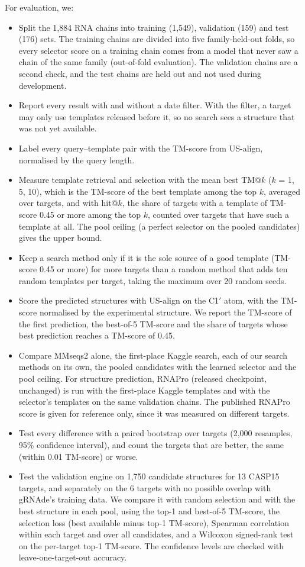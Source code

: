 \documentclass{FastFyp}
\begin{document}
For evaluation, we:
\begin{itemize}
\item Split the 1,884 RNA chains into training (1,549), validation (159) and test (176) sets. The training chains are divided into five family-held-out folds, so every selector score on a training chain comes from a model that never saw a chain of the same family (out-of-fold evaluation). The validation chains are a second check, and the test chains are held out and not used during development.
\item Report every result with and without a date filter. With the filter, a target may only use templates released before it, so no search sees a structure that was not yet available.
\item Label every query--template pair with the TM-score from US-align, normalised by the query length.
\item Measure template retrieval and selection with the mean best TM@$k$ ($k$ = 1, 5, 10), which is the TM-score of the best template among the top $k$, averaged over targets, and with hit@$k$, the share of targets with a template of TM-score 0.45 or more among the top $k$, counted over targets that have such a template at all. The pool ceiling (a perfect selector on the pooled candidates) gives the upper bound.
\item Keep a search method only if it is the sole source of a good template (TM-score 0.45 or more) for more targets than a random method that adds ten random templates per target, taking the maximum over 20 random seeds.
\item Score the predicted structures with US-align on the C1$'$ atom, with the TM-score normalised by the experimental structure. We report the TM-score of the first prediction, the best-of-5 TM-score and the share of targets whose best prediction reaches a TM-score of 0.45.
\item Compare MMseqs2 alone, the first-place Kaggle search, each of our search methods on its own, the pooled candidates with the learned selector and the pool ceiling. For structure prediction, RNAPro (released checkpoint, unchanged) is run with the first-place Kaggle templates and with the selector's templates on the same validation chains. The published RNAPro score is given for reference only, since it was measured on different targets.
\item Test every difference with a paired bootstrap over targets (2,000 resamples, 95\% confidence interval), and count the targets that are better, the same (within 0.01 TM-score) or worse.
\item Test the validation engine on 1,750 candidate structures for 13 CASP15 targets, and separately on the 6 targets with no possible overlap with gRNAde's training data. We compare it with random selection and with the best structure in each pool, using the top-1 and best-of-5 TM-score, the selection loss (best available minus top-1 TM-score), Spearman correlation within each target and over all candidates, and a Wilcoxon signed-rank test on the per-target top-1 TM-score. The confidence levels are checked with leave-one-target-out accuracy.
\end{itemize}
\end{document}
